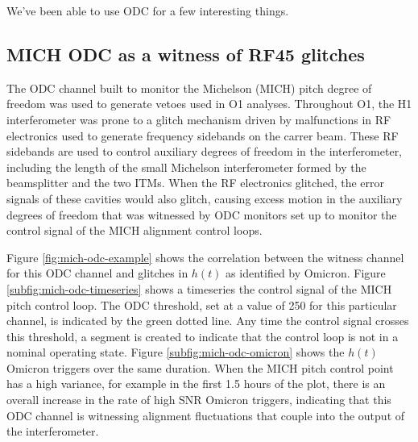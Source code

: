 We've been able to use ODC for a few interesting things.

\subsection{MICH ODC as a witness of RF45 glitches}

The ODC channel built to monitor the Michelson (MICH) pitch degree of freedom 
was used to generate vetoes used in O1 analyses. Throughout O1, the H1 
interferometer was prone to a glitch mechanism driven by malfunctions in 
RF electronics used to generate frequency sidebands on the carrer beam. 
These RF sidebands are used to control auxiliary degrees of freedom in the 
interferometer, including the length of the small Michelson interferometer 
formed by the beamsplitter and the two ITMs. When the RF electronics glitched, 
the error signals of these cavities would also glitch, causing excess motion 
in the auxiliary degrees of freedom that was witnessed by ODC monitors set 
up to monitor the control signal of the MICH alignment control loops. 

Figure \ref{fig:mich-odc-example} 
shows the correlation between the witness channel for this ODC channel 
and glitches in $h(t)$ as identified by Omicron. Figure \ref{subfig:mich-odc-timeseries} 
shows a timeseries the control signal of the MICH pitch control loop. The ODC threshold, 
set at a value of 250 for this particular channel, is indicated by the green dotted 
line. Any time the control signal crosses this threshold, a segment is created to 
indicate that the control loop is not in a nominal operating state. Figure 
\ref{subfig:mich-odc-omicron} shows the $h(t)$ Omicron triggers over the same 
duration. When the MICH pitch control point has a high variance, for example 
in the first 1.5 hours of the plot, there is an 
overall increase in the rate of high SNR Omicron triggers, indicating that 
this ODC channel is witnessing alignment fluctuations that couple into the 
output of the interferometer. 

